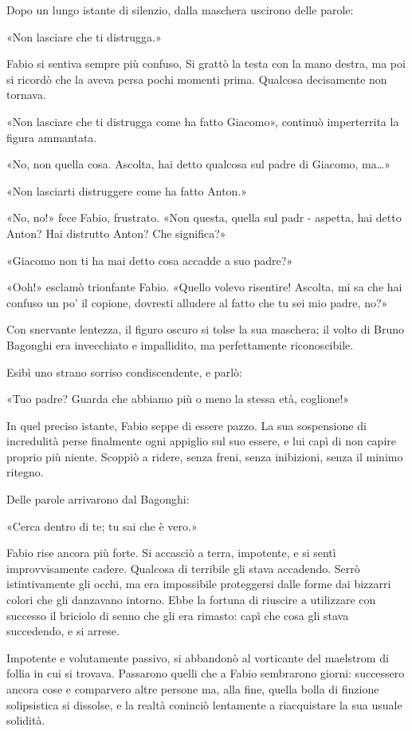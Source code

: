 Dopo un lungo istante di silenzio, dalla maschera uscirono delle parole:

«Non lasciare che ti distrugga.»

Fabio si sentiva sempre più confuso, Si grattò la testa con la mano destra, ma poi si ricordò che la aveva persa pochi momenti prima. Qualcosa decisamente non tornava.

«Non lasciare che ti distrugga come ha fatto Giacomo», continuò imperterrita la figura ammantata.

«No, non quella cosa. Ascolta, hai detto qualcosa sul padre di Giacomo, ma\ldots»

«Non lasciarti distruggere come ha fatto Anton.»

«No, no!» fece Fabio, frustrato. «Non questa, quella sul padr - aspetta, hai detto Anton? Hai distrutto Anton? Che significa?»

«Giacomo non ti ha mai detto cosa accadde a suo padre?»

«Ooh!» esclamò trionfante Fabio. «Quello volevo risentire! Ascolta, mi sa che hai confuso un po' il copione, dovresti alludere al fatto che tu sei mio padre, no?»

Con snervante lentezza, il figuro oscuro si tolse la sua maschera; il volto di Bruno Bagonghi era invecchiato e impallidito, ma perfettamente riconoscibile.

Esibì uno strano sorriso condiscendente, e parlò:

«Tuo padre? Guarda che abbiamo più o meno la stessa età, coglione!»

In quel preciso istante, Fabio seppe di essere pazzo. La sua sospensione di incredulità perse finalmente ogni appiglio sul suo essere, e lui capì di non capire proprio più niente. Scoppiò a ridere, senza freni, senza inibizioni, senza il minimo ritegno.

Delle parole arrivarono dal Bagonghi:

«Cerca dentro di te; tu sai che è vero.»

Fabio rise ancora più forte. Si accasciò a terra, impotente, e si sentì improvvisamente cadere. Qualcosa di terribile gli stava accadendo. Serrò istintivamente gli occhi, ma era impossibile proteggersi dalle forme dai bizzarri colori che gli danzavano intorno. Ebbe la fortuna di riuscire a utilizzare con successo il briciolo di senno che gli era rimasto: capì che cosa gli stava succedendo, e si arrese.

Impotente e volutamente passivo, si abbandonò al vorticante del maelstrom di follia in cui si trovava. Passarono quelli che a Fabio sembrarono giorni: successero ancora cose e comparvero altre persone ma, alla fine, quella bolla di finzione solipsistica si dissolse, e la realtà coninciò lentamente a riacquistare la sua usuale solidità.